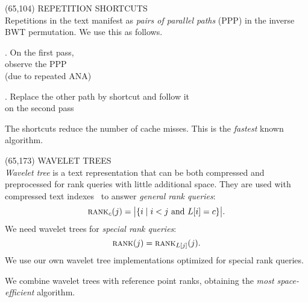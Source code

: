 \begin{textblock}{60}(65,104) 
  {\sffamily\normalsize{\color{sciorange}
      REPETITION SHORTCUTS}}\vspace{1mm}\\
  \footnotesize 
  Repetitions in the text manifest as \emph{pairs of parallel paths}
  (PPP) in the inverse BWT permutation. We use this as follows.
  \vspace{3mm}

  \begin{minipage}[t]{29mm}
    \scriptsize\sffamily
    . On the {\color{first}first pass},\\observe the PPP\\
    (due to repeated ANA)
    \begin{center}
      
    \end{center}
  \end{minipage}
  \hfill
  \begin{minipage}[t]{29mm}
    \scriptsize\sffamily
    . Replace the {\color{second}other path} by shortcut and
    follow it\\on the second pass
    \begin{center}
      
    \end{center}
  \end{minipage}
  \vspace{3mm}
  
  The shortcuts reduce the number of cache misses.  This is the
  \emph{fastest} known algorithm.
\end{textblock} 

\begin{textblock}{60}(65,173)
  {\sffamily\normalsize{\color{sciorange}
      WAVELET TREES}}\vspace{1mm}\\
  \footnotesize 
  \emph{Wavelet tree} is a text representation that can be both
  compressed and preprocessed for rank que\-ries with little
  additional space.  They are used with compressed text
  indexes~\cite{nm2007} to answer \emph{general rank queries}:
  \[
  \textsc{rank}_c(j)=\big|\{i \mid i<j \textrm{ and }
  L[i]=c\}\big|.
  \]
  We need wavelet trees for \emph{special rank queries}:
  \[
  \textsc{rank}(j)=\textsc{rank}_{L[j]}(j).
  \]
  We use our own wavelet tree implementations optimized for special
  rank queries.
  \vspace{1mm}

  We combine wavelet trees with reference point
  ranks, obtaining the \emph{most space-efficient} algorithm.
\end{textblock}
